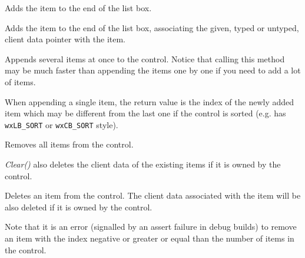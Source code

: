 
\label{wxcontrolwithitemsappend}


Adds the item to the end of the list box.



Adds the item to the end of the list box, associating the given, typed or
untyped, client data pointer with the item.


Appends several items at once to the control. Notice that calling this method
may be much faster than appending the items one by one if you need to add a lot
of items.





When appending a single item, the return value is the index of the newly added
item which may be different from the last one if the control is sorted (e.g.
has {\tt wxLB\_SORT} or {\tt wxCB\_SORT} style).

\label{wxcontrolwithitemsclear}


Removes all items from the control.

{\it Clear()} also deletes the client data of the existing items if it is owned
by the control.

\label{wxcontrolwithitemsdelete}


Deletes an item from the control. The client data associated with the item
will be also deleted if it is owned by the control.

Note that it is an error (signalled by an assert failure in debug builds) to
remove an item with the index negative or greater or equal than the number of
items in the control.

